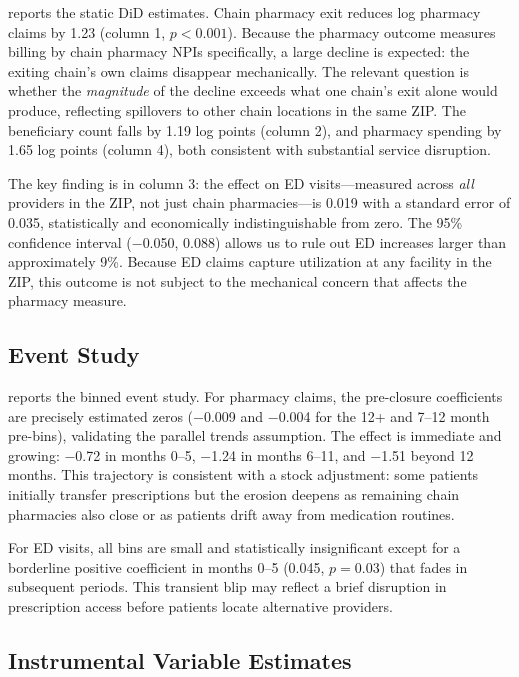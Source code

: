 \documentclass[12pt]{article}
\begin{document}
 reports the static DiD estimates. Chain pharmacy exit reduces log pharmacy claims by 1.23 (column 1, $p < 0.001$). Because the pharmacy outcome measures billing by chain pharmacy NPIs specifically, a large decline is expected: the exiting chain's own claims disappear mechanically. The relevant question is whether the \textit{magnitude} of the decline exceeds what one chain's exit alone would produce, reflecting spillovers to other chain locations in the same ZIP. The beneficiary count falls by 1.19 log points (column 2), and pharmacy spending by 1.65 log points (column 4), both consistent with substantial service disruption.

The key finding is in column 3: the effect on ED visits---measured across \textit{all} providers in the ZIP, not just chain pharmacies---is 0.019 with a standard error of 0.035, statistically and economically indistinguishable from zero. The 95\% confidence interval ($-$0.050, 0.088) allows us to rule out ED increases larger than approximately 9\%. Because ED claims capture utilization at any facility in the ZIP, this outcome is not subject to the mechanical concern that affects the pharmacy measure.

\subsection{Event Study}



 reports the binned event study. For pharmacy claims, the pre-closure coefficients are precisely estimated zeros ($-$0.009 and $-$0.004 for the 12+ and 7--12 month pre-bins), validating the parallel trends assumption. The effect is immediate and growing: $-$0.72 in months 0--5, $-$1.24 in months 6--11, and $-$1.51 beyond 12 months. This trajectory is consistent with a stock adjustment: some patients initially transfer prescriptions but the erosion deepens as remaining chain pharmacies also close or as patients drift away from medication routines.

For ED visits, all bins are small and statistically insignificant except for a borderline positive coefficient in months 0--5 (0.045, $p = 0.03$) that fades in subsequent periods. This transient blip may reflect a brief disruption in prescription access before patients locate alternative providers.

\subsection{Instrumental Variable Estimates}
\end{document}

